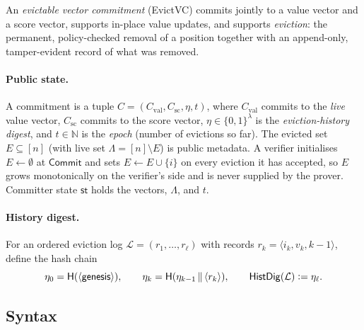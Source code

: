 \documentclass[version=preprint]{iacrcc}
\theoremstyle{definition}
\newcommand{\secpar}{\lambda}
\newcommand{\bit}{\{0,1\}}
\newcommand{\defeq}{\vcentcolon=}
\newcommand{\concat}{\,\|\,}
\newcommand{\Commit}{\mathsf{Commit}}
\newcommand{\aux}{\mathsf{st}}
\newcommand{\HistDig}{\mathsf{HistDig}}
\newcommand{\Val}{\mathrm{val}}
\newcommand{\Sc}{\mathrm{sc}}
\newcommand{\Cval}{C_{\Val}}
\newcommand{\Csc}{C_{\Sc}}
\newcommand{\Live}{\Lambda}
\newcommand{\Evicted}{E}
\newcommand{\hash}{\mathsf{H}}
\newcommand{\Log}{\mathcal{L}}
\begin{document}
An \emph{evictable vector commitment} (EvictVC) commits jointly to a value
vector and a score vector, supports in-place value updates, and supports
\emph{eviction}: the permanent, policy-checked removal of a position together
with an append-only, tamper-evident record of what was removed.

\paragraph{Public state.}
A commitment is a tuple $C=(\Cval,\Csc,\eta,t)$, where $\Cval$ commits to the
\emph{live} value vector, $\Csc$ commits to the score vector,
$\eta\in\bit^{\secpar}$ is the \emph{eviction-history digest}, and
$t\in\mathbb{N}$ is the \emph{epoch} (number of evictions so far). The evicted
set $\Evicted\subseteq[n]$ (with live set $\Live=[n]\setminus\Evicted$) is public
metadata. A verifier initialises $\Evicted\leftarrow\emptyset$ at $\Commit$ and
sets $\Evicted\leftarrow\Evicted\cup\{i\}$ on every eviction it has accepted, so
$\Evicted$ grows monotonically on the verifier's side and is never supplied by
the prover. Committer state $\aux$ holds the vectors, $\Live$, and $t$.

\paragraph{History digest.}
For an ordered eviction log $\Log=(r_1,\dots,r_\ell)$ with records
$r_k=\langle i_k,v_k,k-1\rangle$, define the hash chain
\[
  \eta_0=\hash(\langle\textsf{genesis}\rangle),\qquad
  \eta_k=\hash(\eta_{k-1}\concat\langle r_k\rangle),\qquad
  \HistDig(\Log)\defeq\eta_\ell .
\]

\subsection{Syntax}
\end{document}
